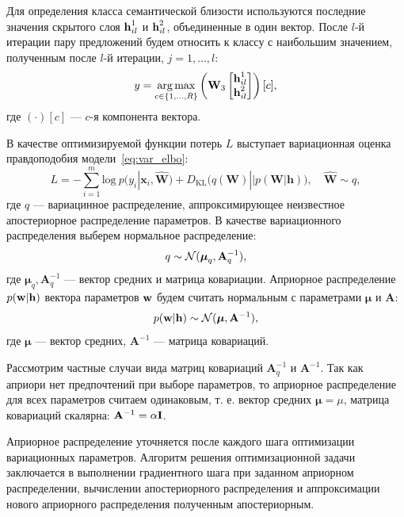 Для определения класса семантической близости используются последние значения скрытого слоя ${\textbf{h}}_{il}^1$ и ${\textbf{h}}_{il}^2$, объединенные в один вектор. После $l$-й итерации 
пару предложений будем относить к классу с наибольшим значением, полученным после $l$-й итерации, $j=1,\dots,l$:
\begin{gather}
y = \argmax_{c\in \{1,\dots,R\}}
\left(\mathbf{W}_3%
\begin{bmatrix}
\bh_{il}^1\\
\bh_{il}^2
\end{bmatrix}\right)[c],
\label{eq:classify}
\end{gather}
где $(\cdot)[c]$ --- $c$-я компонента вектора. 

В качестве оптимизируемой функции потерь $L$ выступает вариационная оценка правдоподобия модели~\eqref{eq:var_elbo}:
\begin{equation}
\label{eq:applied_elbo}
    L = -\sum_{i=1}^m \text{log}~p({y}_i|\mathbf{x}_i, \hat{\mathbf{W}}) + D_\text{KL}\bigl(q (\mathbf{W}) || p (\mathbf{W}|\mathbf{h})\bigr),\quad \hat{\mathbf{W}} \sim q,
\end{equation}
где $q$ --- вариацинное распределение, аппроксимирующее неизвестное апостериорное распределение параметров.
В качестве вариационного распределения выберем нормальное распределение:
$$q \sim {\mathcal{N}}(\boldsymbol{\mu}_q,\mathbf{A}_q^{-1}),$$
где $\boldsymbol{\mu}_q,\mathbf{A}_q^{-1}$ --- вектор средних и матрица ковариации.
Априорное распределение $p({\textbf{w}}|\mathbf{h})$ вектора параметров ${\textbf{w}}$ будем считать нормальным с параметрами $\boldsymbol{\mu}$ и $\mathbf{A}$:
$$p({\textbf{w}}|\mathbf{h}) \sim {\mathcal{N}}(\boldsymbol{\mu}, \mathbf{A}^{-1}),$$
где $\boldsymbol{\mu}$ --- вектор средних, $\mathbf{A}^{-1}$ --- матрица ковариаций.

Рассмотрим частные случаи вида матриц ковариаций $\mathbf{A}^{-1}_q$ и $\mathbf{A}^{-1}$. Так как априори нет предпочтений при выборе параметров, то априорное распределение для всех параметров считаем одинаковым, т. е. вектор средних $\boldsymbol{\mu} = \mu$, матрица ковариаций скалярна: $\mathbf{A}^{-1} = \alpha{\textbf{I}}$.

Априорное распределение уточняется после каждого шага оптимизации вариационных параметров.
Алгоритм решения оптимизационной задачи заключается в выполнении градиентного шага при заданном априорном распределении, вычислении апостериорного распределения и аппроксимации нового априорного распределения полученным апостериорным.

